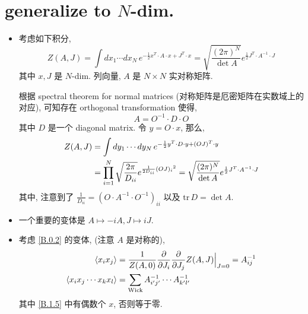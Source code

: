 \section{generalize to \texorpdfstring{$N$}{N}-dim.}
\begin{itemize}
	\item 考虑如下积分,
	\begin{equation} \label{B.1.1}
		Z(A, J) = \int dx_1 \cdots dx_N \, e^{- \frac{1}{2} x^T \cdot A \cdot x + J^T \cdot x} = \sqrt{\frac{(2 \pi)^N}{\det A}} e^{\frac{1}{2} J^T \cdot A^{- 1} \cdot J}
	\end{equation}
	其中 $x, J$ 是 $N$-dim. 列向量, $A$ 是 $N \times N$ 实对称矩阵.
	
	\begin{tcolorbox}[title=calculation:]
		根据 spectral theorem for normal matrices (对称矩阵是厄密矩阵在实数域上的对应), 可知存在 orthogonal transformation 使得,
		\begin{equation}
			A = O^{- 1} \cdot D \cdot O
		\end{equation}
		其中 $D$ 是一个 diagonal matrix. 令 $y = O \cdot x$, 那么,
		\begin{align}
			Z(A, J) &= \int dy_1 \cdots dy_N \, e^{- \frac{1}{2} y^T \cdot D \cdot y + (O J)^T \cdot y} \notag \\
			&= \prod_{i = 1}^N \sqrt{\frac{2 \pi}{D_{i i}}} e^{\frac{1}{2 D_{i i}} {(O J)_i}^2} = \sqrt{\frac{(2 \pi)^N}{\det A}} e^{\frac{1}{2} J^T \cdot A^{- 1} \cdot J}
		\end{align}
		其中, 注意到了 $\frac{1}{D_{i i}} = (O \cdot A^{- 1} \cdot O^{- 1})_{i i}$ 以及 $\mathrm{tr} \, D = \det A$.
	\end{tcolorbox}
	
	\item 一个重要的变体是 $A \mapsto - i A, J \mapsto i J$.
	
	\item 考虑 \eqref{B.0.2} 的变体, (注意 $A$ 是对称的),
	\begin{align}
		\braket{x_i x_j} &= \frac{1}{Z(A, 0)} \frac{\partial}{\partial J_i} \frac{\partial}{\partial J_j} Z(A, J) \Big|_{J = 0} = A^{- 1}_{i j} \\
		\braket{x_i x_j \cdots x_k x_l} &= \sum_{\text{Wick}} A^{- 1}_{i' j'} \cdots A^{- 1}_{k' l'} \label{B.1.5}
	\end{align}
	其中 \eqref{B.1.5} 中有偶数个 $x$, 否则等于零.
	

\end{itemize}

